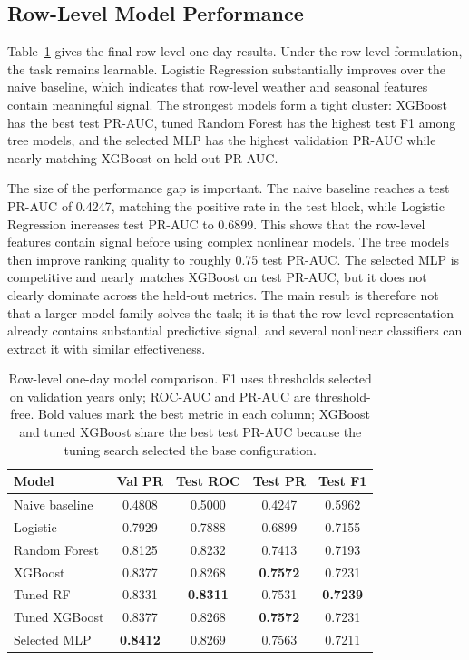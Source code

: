 \documentclass{article}
\begin{document}
\subsection{Row-Level Model Performance}

Table~\ref{tab:model_results} gives the final row-level one-day results. Under the row-level formulation, the task remains learnable. Logistic Regression substantially improves over the naive baseline, which indicates that row-level weather and seasonal features contain meaningful signal. The strongest models form a tight cluster: XGBoost has the best test PR-AUC, tuned Random Forest has the highest test F1 among tree models, and the selected MLP has the highest validation PR-AUC while nearly matching XGBoost on held-out PR-AUC.

The size of the performance gap is important. The naive baseline reaches a test PR-AUC of 0.4247, matching the positive rate in the test block, while Logistic Regression increases test PR-AUC to 0.6899. This shows that the row-level features contain signal before using complex nonlinear models. The tree models then improve ranking quality to roughly 0.75 test PR-AUC. The selected MLP is competitive and nearly matches XGBoost on test PR-AUC, but it does not clearly dominate across the held-out metrics. The main result is therefore not that a larger model family solves the task; it is that the row-level representation already contains substantial predictive signal, and several nonlinear classifiers can extract it with similar effectiveness.

\begin{table}[t]
\caption{Row-level one-day model comparison. F1 uses thresholds selected on validation years only; ROC-AUC and PR-AUC are threshold-free. Bold values mark the best metric in each column; XGBoost and tuned XGBoost share the best test PR-AUC because the tuning search selected the base configuration.}
\label{tab:model_results}
\vskip 0.03in
\begin{center}
\begin{small}
\begin{tabular}{lcccc}
\toprule
Model & Val PR & Test ROC & Test PR & Test F1 \\
\midrule
Naive baseline & 0.4808 & 0.5000 & 0.4247 & 0.5962 \\
Logistic & 0.7929 & 0.7888 & 0.6899 & 0.7155 \\
Random Forest & 0.8125 & 0.8232 & 0.7413 & 0.7193 \\
XGBoost & 0.8377 & 0.8268 & \textbf{0.7572} & 0.7231 \\
Tuned RF & 0.8331 & \textbf{0.8311} & 0.7531 & \textbf{0.7239} \\
Tuned XGBoost & 0.8377 & 0.8268 & \textbf{0.7572} & 0.7231 \\
Selected MLP & \textbf{0.8412} & 0.8269 & 0.7563 & 0.7211 \\
\bottomrule
\end{tabular}
\end{small}
\end{center}
\vskip -0.14in
\end{table}
\end{document}
